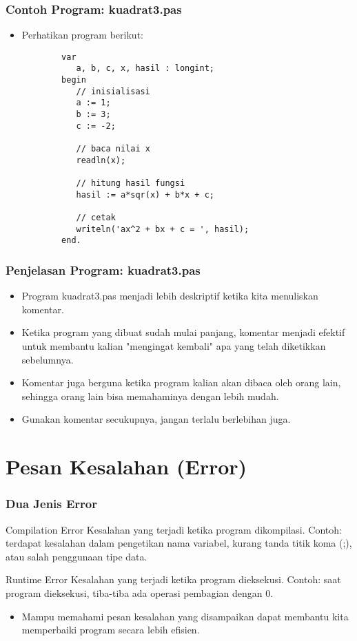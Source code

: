 \documentclass{beamer}
\begin{document}
\begin{frame} [fragile]
\frametitle{Contoh Program: kuadrat3.pas}
\begin{itemize}
	\item Perhatikan program berikut:
	\begin{lstlisting}
		var
		   a, b, c, x, hasil : longint;
		begin
		   // inisialisasi
		   a := 1;
		   b := 3;
		   c := -2;
		   
		   // baca nilai x
		   readln(x);
		
		   // hitung hasil fungsi
		   hasil := a*sqr(x) + b*x + c;
		
		   // cetak
		   writeln('ax^2 + bx + c = ', hasil);
		end.
	\end{lstlisting}
\end{itemize}
\end{frame}

\begin{frame}
\frametitle{Penjelasan Program: kuadrat3.pas}
\begin{itemize}
	\item Program kuadrat3.pas menjadi lebih deskriptif ketika kita menuliskan komentar.
	\item Ketika program yang dibuat sudah mulai panjang, komentar menjadi efektif untuk membantu kalian "mengingat kembali" apa yang telah diketikkan sebelumnya.
	\item Komentar juga berguna ketika program kalian akan dibaca oleh orang lain, sehingga orang lain bisa memahaminya dengan lebih mudah.
	\item Gunakan komentar secukupnya, jangan terlalu berlebihan juga.
\end{itemize}
\end{frame}

\section{Pesan Kesalahan (Error)}
\frame{\sectionpage}

\begin{frame}
\frametitle{Dua Jenis Error}
\begin{block}{Compilation Error}
	Kesalahan yang terjadi ketika program dikompilasi.\newline
	Contoh: terdapat kesalahan dalam pengetikan nama variabel, kurang tanda titik koma (;), atau salah penggunaan tipe data.
\end{block}
\begin{block}{Runtime Error}
	Kesalahan yang terjadi ketika program dieksekusi.\newline
	Contoh: saat program dieksekusi, tiba-tiba ada operasi pembagian dengan 0.
\end{block}

\begin{itemize}
	\item Mampu memahami pesan kesalahan yang disampaikan dapat membantu kita memperbaiki program secara lebih efisien.
\end{itemize}
\end{frame}
\end{document}
